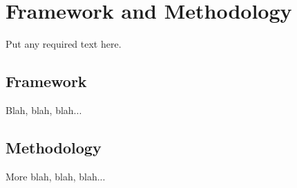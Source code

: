 %

\chapter{Framework and Methodology}

Put any required text here.



\section{Framework}

Blah, blah, blah...



\section{Methodology}
More blah, blah, blah...


